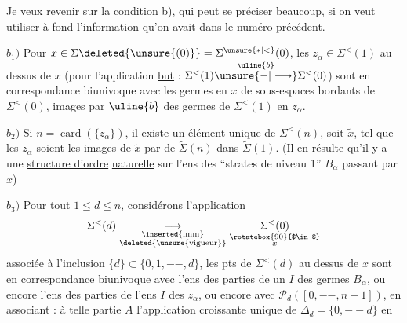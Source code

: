 
Je veux revenir sur la condition b), qui peut se préciser beaucoup, si on veut utiliser à fond l'information qu'on avait dans le numéro précédent.

$b_1)$ Pour $x\in\Sigma\deleted{\unsure{(0)}}=\Sigma^{\unsure{*|<}}(0)$, les $z_\alpha\in\Sigma^{<}(1)$ au dessus de $x$ (pour l'application \uline{but} : $\Sigma^{<}(1)\overset{\uline{b}}{\unsure{-|\longrightarrow}}\Sigma^{<}(0)$) sont en correspondance biunivoque avec les germes  en $x$ de sous-espaces bordants de $\Sigma^{<}(0)$,  images par $\uline{b}$ des germes de $\Sigma^{<}(1)$ en  $z_\alpha$.

$b_2)$  Si $n=\operatorname{card}(\{z_\alpha\})$, il existe un élément  unique de $\Sigma^{<}(n)$, soit $\widetilde{x}$, tel que les  $z_\alpha$ soient les images de $\widetilde{x}$ par  de $\widetilde\Sigma(n)$ dans $\widetilde\Sigma(1)$.
(Il en résulte qu'il y a une \uline{structure d'ordre}  \uline{naturelle} sur l'ens des ``strates de niveau 1'' $B_\alpha$  passant par $x$)

 $b_3)$ Pour tout  $1\leq d\leq n$, considérons l'application
\[
\Sigma^{<}(d)\underset{\substack{\inserted{\text{imm}}\\\deleted{\unsure{\text{vigueur}}}}}{\longrightarrow}\underset{\substack{\rotatebox{90}{$\in$}\\x}}{\Sigma^{<}(0)}
\]
associée à l'inclusion  $\{d\}\subset\{0,1,--,d\}$, les pts  de $\Sigma^{<}(d)$ au dessus de $x$ sont en correspondance biunivoque avec l'ens des parties  de un \deleted{$\unsure{\Sigma}$} $I$ des germes $B_\alpha$, ou encore l'ens des parties  de l'ens $I$ des $z_\alpha$, ou encore avec $\mathcal P_d([0,--,n-1])$, en associant : à telle partie $A$ l'application  croissante unique de $\Delta_d=\{0,--d\}$ en

